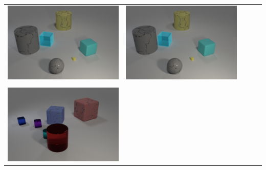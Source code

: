 \begin{table}
\begin{tabular}{@{}ccccc@{}}
\begin{minipage}{.2\textwidth}
      \includegraphics[width=\linewidth]{figures/clevr_datasets/CLEVRA_examples/test1.png}
    \end{minipage}
    &
        \begin{minipage}{.2\textwidth}
      \includegraphics[width=\linewidth]{figures/clevr_datasets/CLEVRA_examples/test_color1.png}
    \end{minipage}
\\ \\
    \begin{minipage}{.2\textwidth}
      \includegraphics[width=\linewidth]{figures/clevr_datasets/CLEVRA_examples/train2.png}

\end{minipage}
\end{tabular}
\end{table}
